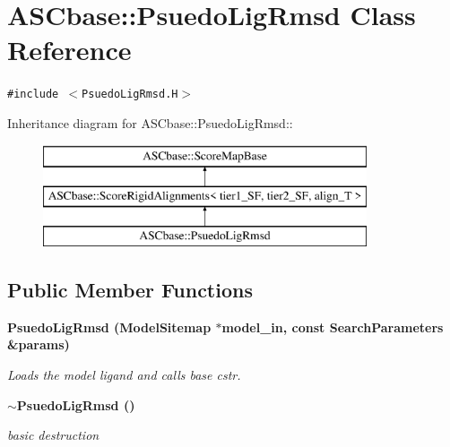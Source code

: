 \section{ASCbase::Psuedo\-Lig\-Rmsd Class Reference}
\label{classASCbase_1_1PsuedoLigRmsd}
{\tt \#include $<$Psuedo\-Lig\-Rmsd.H$>$}

Inheritance diagram for ASCbase::Psuedo\-Lig\-Rmsd::\begin{figure}[H]
\begin{center}
\leavevmode
\includegraphics[height=3cm]{classASCbase_1_1PsuedoLigRmsd}
\end{center}
\end{figure}
\subsection*{Public Member Functions}
\begin{CompactItemize}
\item 
\bf{Psuedo\-Lig\-Rmsd} (\bf{Model\-Sitemap} $\ast$model\_\-in, const \bf{Search\-Parameters} \&params)\label{classASCbase_1_1PsuedoLigRmsd_cb2260f005103d3160c017839c4bd06e}

\begin{CompactList}\small\item\em Loads the model ligand and calls base cstr. \item\end{CompactList}\item 
\bf{$\sim$Psuedo\-Lig\-Rmsd} ()\label{classASCbase_1_1PsuedoLigRmsd_2ab21999e1e371a9eaa2839251d15d12}

\begin{CompactList}\small\item\em basic destruction \item\end{CompactList}\end{CompactItemize}
